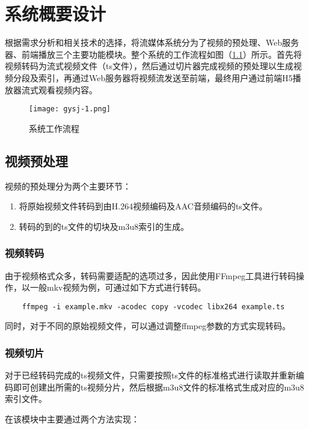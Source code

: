 \documentclass[bachelor]{thesis-uestc}
\begin{document}
\chapter{系统概要设计}

根据需求分析和相关技术的选择，将流媒体系统分为了视频的预处理、Web服务器、前端播放三个主要功能模块。整个系统的工作流程如图（\ref{gysj-1}）所示。首先将视频转码为流式视频文件（ts文件），然后通过切片器完成视频的预处理以生成视频分段及索引，再通过Web服务器将视频流发送至前端，最终用户通过前端H5播放器流式观看视频内容。

\begin{figure}[h]
\texttt{[image: gysj-1.png]}
\caption{系统工作流程}
\label{gysj-1} 
\end{figure}


\section{视频预处理}

视频的预处理分为两个主要环节：

\begin{enumerate}
	\item 将原始视频文件转码到由H.264视频编码及AAC音频编码的ts文件。
	\item 转码的到的ts文件的切块及m3u8索引的生成。
\end{enumerate}

\subsection{视频转码}

由于视频格式众多，转码需要适配的选项过多，因此使用FFmpeg工具进行转码操作，以一般mkv视频为例，可通过如下方式进行转码。

\begin{lstlisting}
	ffmpeg -i example.mkv -acodec copy -vcodec libx264 example.ts
\end{lstlisting}

同时，对于不同的原始视频文件，可以通过调整ffmpeg参数的方式实现转码。

\subsection{视频切片}

对于已经转码完成的ts视频文件，只需要按照ts文件的标准格式进行读取并重新编码即可创建出所需的ts视频分片，然后根据m3u8文件的标准格式生成对应的m3u8索引文件。

在该模块中主要通过两个方法实现：
\end{document}
